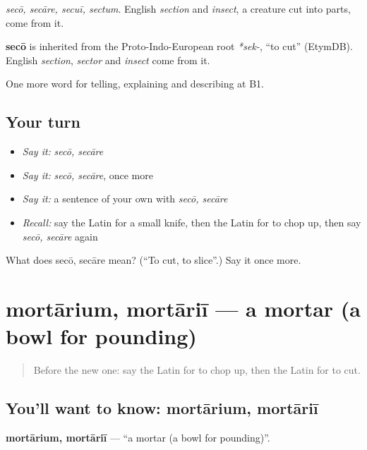 \emph{secō, secāre, secuī, sectum}. English \emph{section} and \emph{insect}, a creature cut into parts, come from it.

\begin{cousinweb}
\textbf{secō} is inherited from the Proto-Indo-European root \emph{*sek-}, \textquotedblleft{}to cut\textquotedblright{} (EtymDB). English \emph{section}, \emph{sector} and \emph{insect} come from it.
\end{cousinweb}

\begin{grammarlens}[title={What you've built}]
One more word for telling, explaining and describing at B1.
\end{grammarlens}

\subsection*{Your turn}
\begin{itemize}
\raggedright
  \item \emph{Say it:} \emph{secō, secāre}
  \item \emph{Say it:} \emph{secō, secāre}, once more
  \item \emph{Say it:} a sentence of your own with \emph{secō, secāre}
  \item \emph{Recall:} say the Latin for a small knife, then the Latin for to chop up, then say \emph{secō, secāre} again
\end{itemize}

\begin{tcolorbox}[breakable,colback=teal!4,colframe=teal!35!black,title={Before you move on}]
What does secō, secāre mean? (\textquotedblleft{}To cut, to slice\textquotedblright{}.) Say it once more.
\end{tcolorbox}
\section[mortārium, mortāriī]{mortārium, mortāriī — a mortar (a bowl for pounding)}

\label{lesson:LA-C351-mortarium}



\begin{quote}
Before the new one: say the Latin for to chop up, then the Latin for to cut.
\end{quote}

\subsection*{You'll want to know: mortārium, mortāriī}
\textbf{mortārium, mortāriī} — \textquotedblleft{}a mortar (a bowl for pounding)\textquotedblright{}.

